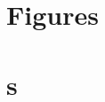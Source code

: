 \documentclass[twoside,a4wide,10pt]{article}
\begin{document}


\clearpage
\section*{Figures}


\clearpage
\section*{	s}


\end{document}
